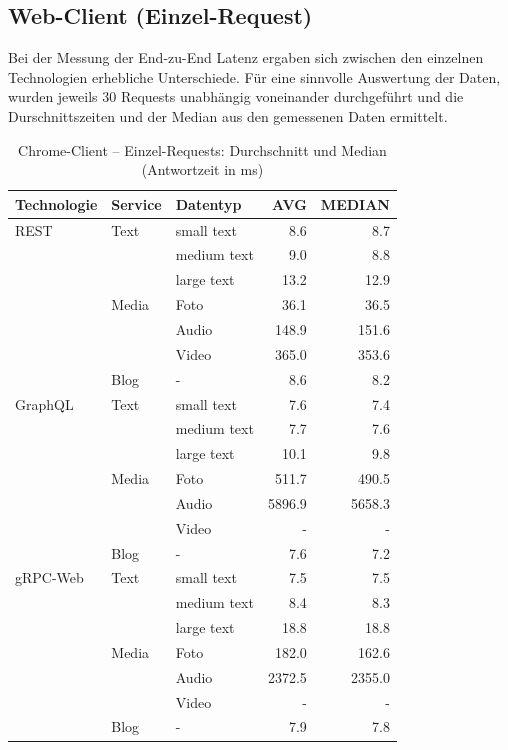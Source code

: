 \clearpage
\subsection{Web-Client (Einzel-Request)}

Bei der Messung der End-zu-End Latenz ergaben sich zwischen den einzelnen Technologien erhebliche Unterschiede. 
Für eine sinnvolle Auswertung der Daten, wurden jeweils 30 Requests unabhängig voneinander durchgeführt und die Durschnittszeiten und der Median aus den gemessenen Daten ermittelt. 

\begin{table}[h]
	\centering
	\caption{Chrome-Client – Einzel-Requests: Durchschnitt und Median (Antwortzeit in ms)}
	\label{tab:chrome-single-avg}
	\renewcommand{\arraystretch}{1.1}
	\begin{tabular}{|l|l|l|r|r|}
		\hline
		\textbf{Technologie} & \textbf{Service} & \textbf{Datentyp} & \textbf{AVG} & \textbf{MEDIAN} \\
		\hline
		REST & Text  & small text  & 8.6 & 8.7 \\
		&       & medium text & 9.0 & 8.8 \\
		&       & large text  & 13.2 & 12.9 \\
		& Media & Foto        & 36.1 & 36.5 \\
		&       & Audio       & 148.9 & 151.6 \\
		&       & Video       & 365.0 & 353.6 \\
		& Blog  & -           & 8.6 & 8.2 \\
		\hline
		GraphQL & Text  & small text  & 7.6 & 7.4 \\
		&       & medium text & 7.7 & 7.6 \\
		&       & large text  & 10.1 & 9.8 \\
		& Media & Foto        & 511.7 & 490.5 \\
		&       & Audio       & 5896.9 & 5658.3 \\
		&       & Video       & - & - \\
		& Blog  & -           & 7.6 & 7.2 \\
		\hline
		gRPC-Web & Text  & small text  & 7.5 & 7.5 \\
		&       & medium text & 8.4 & 8.3 \\
		&       & large text  & 18.8 & 18.8 \\
		& Media & Foto        & 182.0 & 162.6 \\
		&       & Audio       & 2372.5 & 2355.0 \\
		&       & Video       & - & - \\
		& Blog  & -           & 7.9 & 7.8 \\
		\hline
	\end{tabular}
\end{table}

